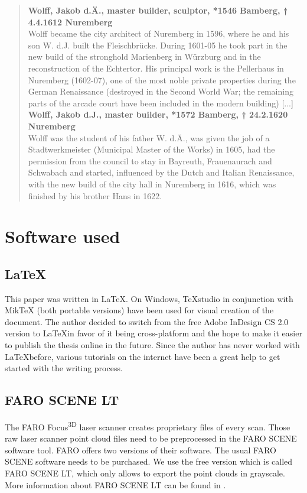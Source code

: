\blockquote{
	
	\textbf{Wolff, Jakob d.Ä., master builder, sculptor, *1546 Bamberg, † 4.4.1612 Nuremberg} \\
	Wolff became the city architect of Nuremberg in 1596, where he and his son W. d.J. built the Fleischbrücke. During 1601-05 he took part in the new build of the stronghold Marienberg in Würzburg and in the reconstruction of the Echtertor. His principal work is the Pellerhaus in Nuremberg (1602-07), one of the most noble private properties during the German Renaissance (destroyed in the Second World War; the remaining parts of the arcade court have been included in the modern building) [...] \\
	
	\textbf{Wolff, Jakob d.J., master builder, *1572 Bamberg, † 24.2.1620 Nuremberg} \\
	Wolff was the student of his father W. d.Ä., was given the job of a Stadtwerkmeister (Municipal Master of the Works) in 1605, had the permission from the council to stay in Bayreuth, Frauenaurach and Schwabach and started, influenced by the Dutch and Italian Renaissance, with the new build of the city hall in Nuremberg in 1616, which was finished by his brother Hans in 1622. \\
	
}





\section{Software used}

\subsection{\LaTeX}
This paper was written in \LaTeX. On Windows, TeXstudio in conjunction with MikTeX (both portable versions) have been used for visual creation of the document. The author decided to switch from the free Adobe InDesign CS 2.0 version to \LaTeX in favor of it being cross-platform and the hope to make it easier to publish the thesis online in the future. Since the author has never worked with \LaTeX before, various tutorials \parencite{ytLaTeX,webLaTeX-Tutorial} on the internet have been a great help to get started with the writing process.

\subsection{FARO SCENE LT}
The FARO Focus\textsuperscript{3D} laser scanner creates proprietary files of every scan. Those raw laser scanner point cloud files need to be preprocessed in the FARO SCENE software tool. FARO offers two versions of their software. The usual FARO SCENE software needs to be purchased. We use the free version which is called FARO SCENE LT, which only allows to export the point clouds in grayscale. More information about FARO SCENE LT can be found in \parencite{appendix_faro_scene_lt}.

